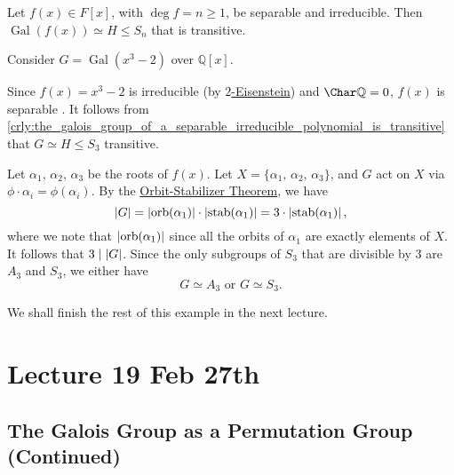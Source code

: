 \documentclass[notoc,notitlepage,nobib]{tufte-book}
\DeclareMathOperator{\Gal}{Gal}
\DeclareMathOperator{\stab}{stab}
\DeclareMathOperator{\orb}{orb}
\begin{document}
\begin{crly}\label{crly:the_galois_group_of_a_separable_irreducible_polynomial_is_transitive}
  Let $f(x) \in F[x]$, with $\deg f = n \geq 1$, be separable and irreducible.
  Then $\Gal(f(x)) \simeq H \leq S_n$ that is transitive.
\end{crly}

\begin{eg}
  Consider $G = \Gal(x^3 - 2)$ over $\mathbb{Q}[x]$.

  Since $f(x) = x^3 - 2$ is irreducible (by
  \hyperref[propo:eisenstein_s_criterion]{$2$-Eisenstein}) and $\Char \mathbb{Q} =
  0$, $f(x)$ is separable . It follows from
  \cref{crly:the_galois_group_of_a_separable_irreducible_polynomial_is_transitive}
  that $G \simeq H \leq S_3$ transitive.

  Let $\alpha_1, \, \alpha_2, \, \alpha_3$ be the roots of $f(x)$. Let $X = \{
  \alpha_1, \, \alpha_2, \, \alpha_3 \}$, and $G$ act on $X$ via $\phi \cdot
  \alpha_i = \phi(\alpha_i)$. By the
  \hyperref[thm:orbit_stabilizer_theorem]{Orbit-Stabilizer Theorem}, we have
  \begin{equation*}
    \abs{ G } = \abs{ \orb(\alpha_1) } \cdot \abs{ \stab(\alpha_1) } = 3 \cdot
    \abs{ \stab(\alpha_1) },
  \end{equation*}
  where we note that $\abs{ \orb(\alpha_1) }$ since all the orbits of $\alpha_1$
  are exactly elements of $X$. It follows that $3 \mid \left|G\right|$. Since the only
  subgroups of $S_3$ that are divisible by $3$ are $A_3$ and $S_3$, we either
  have
  \begin{equation*}
    G \simeq A_3 \text{ or } G \simeq S_3.
  \end{equation*}

\end{eg}

We shall finish the rest of this example in the next lecture.



\chapter{Lecture 19 Feb 27th}%
\label{chp:lecture_19_feb_27th}

\section{The Galois Group as a Permutation Group (Continued)}%
\label{sec:the_galois_group_as_a_permutation_group_continued}
\end{document}
